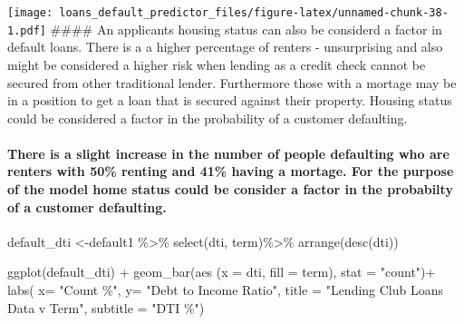 \documentclass[
]{article}
\newenvironment{Shaded}{\begin{snugshade}}{\end{snugshade}}
\newcommand{\AttributeTok}[1]{\textcolor[rgb]{0.77,0.63,0.00}{#1}}
\newcommand{\FunctionTok}[1]{\textcolor[rgb]{0.00,0.00,0.00}{#1}}
\newcommand{\NormalTok}[1]{#1}
\newcommand{\OtherTok}[1]{\textcolor[rgb]{0.56,0.35,0.01}{#1}}
\newcommand{\SpecialCharTok}[1]{\textcolor[rgb]{0.00,0.00,0.00}{#1}}
\newcommand{\StringTok}[1]{\textcolor[rgb]{0.31,0.60,0.02}{#1}}
\begin{document}
\texttt{[image: loans\_default\_predictor\_files/figure-latex/unnamed-chunk-38-1.pdf]}
\#\#\#\# An applicants housing status can also be considerd a factor in
default loans. There is a a higher percentage of renters - unsurprising
and also might be considered a higher risk when lending as a credit
check cannot be secured from other traditional lender. Furthermore those
with a mortage may be in a position to get a loan that is secured
against their property. Housing status could be considered a factor in
the probability of a customer defaulting.

\hypertarget{there-is-a-slight-increase-in-the-number-of-people-defaulting-who-are-renters-with-50-renting-and-41-having-a-mortage.-for-the-purpose-of-the-model-home-status-could-be-consider-a-factor-in-the-probabilty-of-a-customer-defaulting.}{%
\paragraph{There is a slight increase in the number of people defaulting
who are renters with 50\% renting and 41\% having a mortage. For the
purpose of the model home status could be consider a factor in the
probabilty of a customer
defaulting.}\label{there-is-a-slight-increase-in-the-number-of-people-defaulting-who-are-renters-with-50-renting-and-41-having-a-mortage.-for-the-purpose-of-the-model-home-status-could-be-consider-a-factor-in-the-probabilty-of-a-customer-defaulting.}}

\begin{Shaded}
\begin{Highlighting}[]
\NormalTok{default\_dti }\OtherTok{\textless{}{-}}\NormalTok{default1 }\SpecialCharTok{\%\textgreater{}\%}
  \FunctionTok{select}\NormalTok{(dti, term)}\SpecialCharTok{\%\textgreater{}\%}
  \FunctionTok{arrange}\NormalTok{(}\FunctionTok{desc}\NormalTok{(dti))}
\end{Highlighting}
\end{Shaded}

\begin{Shaded}
\begin{Highlighting}[]
\FunctionTok{ggplot}\NormalTok{(default\_dti) }\SpecialCharTok{+}
  \FunctionTok{geom\_bar}\NormalTok{(}\FunctionTok{aes}\NormalTok{ (}\AttributeTok{x =}\NormalTok{ dti, }\AttributeTok{fill =}\NormalTok{ term), }\AttributeTok{stat =} \StringTok{"count"}\NormalTok{)}\SpecialCharTok{+}
  \FunctionTok{labs}\NormalTok{( }\AttributeTok{x=} \StringTok{"Count \%"}\NormalTok{,}
        \AttributeTok{y=} \StringTok{"Debt to Income Ratio"}\NormalTok{,}
        \AttributeTok{title =} \StringTok{"Lending Club Loans Data v Term"}\NormalTok{,}
        \AttributeTok{subtitle =} \StringTok{"DTI \%"}\NormalTok{)}
\end{Highlighting}
\end{Shaded}
\end{document}
